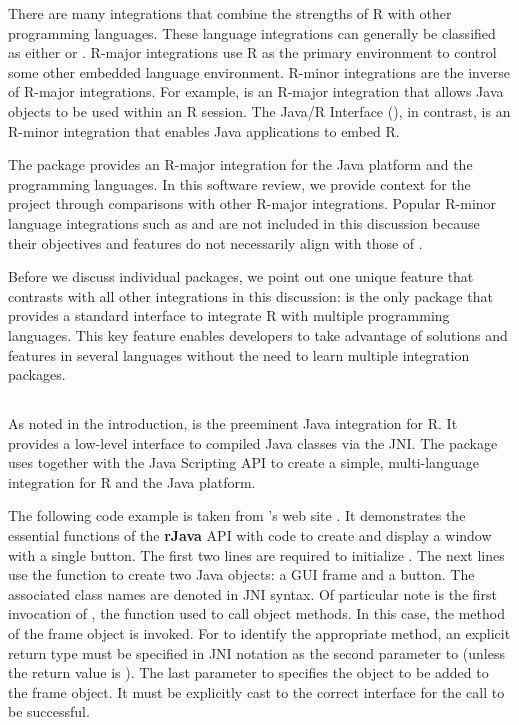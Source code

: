 There are many integrations that combine the strengths of R with other programming languages. These language integrations can generally be classified as either  or . R-major integrations use R as the primary environment to control some other embedded language environment. R-minor integrations are the inverse of R-major integrations. For example,  is an R-major integration that allows Java objects to be used within an R session. The Java/R Interface (), in contrast, is an R-minor integration that enables Java applications to embed R.

The  package provides an R-major integration for the Java platform and the  programming languages. In this software review, we provide context for the  project through comparisons with other R-major integrations. Popular R-minor language integrations such as  \citep{rserve} and  \citep{opencpu} are not included in this discussion because their objectives and features do not necessarily align with those of .

Before we discuss individual packages, we point out one unique feature that contrasts  with all other integrations in this discussion:  is the only package that provides a standard interface to integrate R with multiple programming languages. This key feature enables developers to take advantage of solutions and features in several languages without the need to learn multiple integration packages.

\subsection{}

As noted in the introduction,  is the preeminent Java integration for R. It provides a low-level interface to compiled Java classes via the JNI. The  package uses  together with the Java Scripting API to create a simple, multi-language integration for R and the Java platform.

The following code example is taken from 's web site \citep{rjavaweb}. It demonstrates the essential functions of the \textbf{rJava} API with code to create and display a window with a single button. The first two lines are required to initialize . The next lines use the  function to create two Java objects: a GUI frame and a button. The associated class names are denoted in JNI syntax. Of particular note is the first invocation of , the function used to call object methods. In this case, the  method of the frame object is invoked. For  to identify the appropriate method, an explicit return type must be specified in JNI notation as the second parameter to  (unless the return value is ). The last parameter to  specifies the object to be added to the frame object. It must be explicitly cast to the correct interface for the call to be successful.

